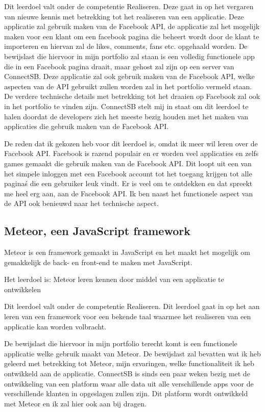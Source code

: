 Dit leerdoel valt onder de competentie Realiseren. Deze gaat in op het vergaren van nieuwe kennis met betrekking tot het realiseren van een applicatie. Deze applicatie zal gebruik maken van de Facebook API, de applicatie zal het mogelijk maken voor een klant om een facebook pagina die beheert wordt door de klant te importeren en hiervan zal de likes, comments, fans etc. opgehaald worden. De bewijslast die hiervoor in mijn portfolio zal staan is een volledig functionele app die in een Facebook pagina draait, maar gehost zal zijn op een server van ConnectSB. Deze applicatie zal ook gebruik maken van de Facebook API, welke aspecten van de API gebruikt zullen worden zal in het portfolio vermeld staan. De verdere technische details met betrekking tot het draaien op Facebook zal ook in het portfolio te vinden zijn. ConnectSB stelt mij in staat om dit leerdoel te halen doordat de developers zich het meeste bezig houden met het maken van applicaties die gebruik maken van de Facebook API.

De reden dat ik gekozen heb voor dit leerdoel is, omdat ik meer wil leren over de Facebook API. Facebook is razend populair en er worden veel applicaties en zelfs games gemaakt die gebruik maken van de Facebook API. Dit loopt uit een van het simpele inloggen met een Facebook account tot het toegang krijgen tot alle pagina\'s die een gebruiker leuk vindt. Er is veel om te ontdekken en dat spreekt me heel erg aan, aan de Facebook API. Ik ben naast het functionele aspect van de API ook benieuwd naar het technische aspect.

\subsection{Meteor, een JavaScript framework}
Meteor is een framework gemaakt in JavaScript en het maakt het mogelijk om gemakkelijk de back- en front-end te maken met JavaScript.

Het leerdoel is: Meteor leren kennen door middel van een applicatie te ontwikkelen

Dit leerdoel valt onder de competentie Realiseren. Dit leerdoel gaat in op het aan leren van een framework voor een bekende taal waarmee het realiseren van een applicatie kan worden volbracht. 

De bewijslast die hiervoor in mijn portfolio terecht komt is een functionele applicatie welke gebruik maakt van Meteor. De bewijslast zal bevatten wat ik heb geleerd met betrekking tot Meteor, mijn ervaringen, welke functionaliteit ik heb ontwikkeld aan de applicatie. ConnectSB is sinds een paar weken bezig met de ontwikkeling van een platform waar alle data uit alle verschillende apps voor de verschillende klanten in opgeslagen zullen zijn. Dit platform wordt ontwikkeld met Meteor en ik zal hier ook aan bij dragen.


